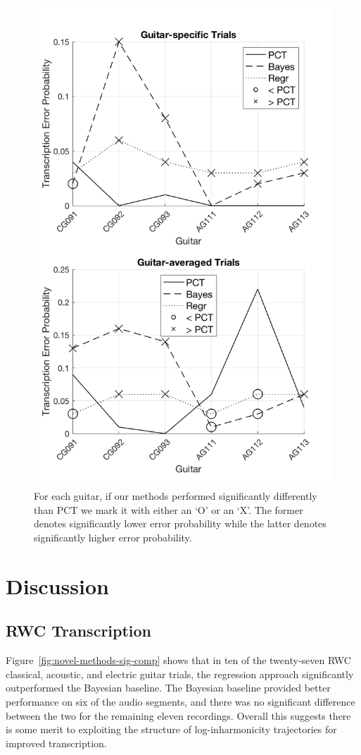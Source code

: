 \documentclass[convention,peer-reviewed]{aesconf}
\begin{document}
\begin{figure}[!t]
\centering
\includegraphics[scale=0.25]{sig-comp-PCT}
\caption{For each guitar, if our methods performed significantly differently than PCT we mark it with either an `O' or an `X'. The former denotes significantly lower error probability while the latter denotes significantly higher error probability.}
\label{fig:sig-comp-PCT}
\end{figure}


\section{Discussion} 
\subsection{RWC Transcription}
Figure~\ref{fig:novel-methods-sig-comp} shows that in ten of the twenty-seven RWC classical, acoustic, and electric guitar trials, the regression approach significantly outperformed the Bayesian baseline. The Bayesian baseline provided better performance on six of the audio segments, and there was no significant difference between the two for the remaining eleven recordings. Overall this suggests there is some merit to exploiting the structure of log-inharmonicity trajectories for improved transcription.
\end{document}
